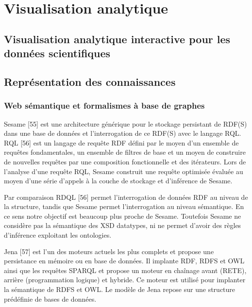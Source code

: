 \section{Visualisation analytique}

\subsection{Visualisation analytique interactive pour les données scientifiques}

\subsection{Représentation des connaissances}

\subsubsection{Web sémantique et formalismes à base de graphes}

Sesame [55] est une architecture générique pour le stockage persistant de RDF(S) dans une base de données et l'interrogation de ce RDF(S) avec le langage RQL. RQL [56] est un langage de requête RDF défini par le moyen d'un ensemble de requêtes fondamentales, un ensemble de filtres de base et un moyen de construire de nouvelles requêtes par une composition fonctionnelle et des itérateurs. Lors de l'analyse d’une requête RQL, Sesame construit une requête optimisée évaluée au moyen d'une série d'appels à la couche de stockage et d’inférence de Sesame.

Par comparaison RDQL [56] permet l'interrogation de données RDF au niveau de la structure, tandis que Sesame permet l’interrogation au niveau sémantique. En ce sens notre objectif est beaucoup plus proche de Sesame. Toutefois Sesame ne considère pas la sémantique des XSD datatypes, ni ne permet d’avoir des règles d'inférence exploitant les ontologies.

Jena [57] est l’un des moteurs actuels les plus complets et propose une persistance en mémoire ou en base de données. Il implante RDF, RDFS et OWL ainsi que les requêtes SPARQL et propose un moteur en chaînage avant (RETE), arrière (programmation logique) et hybride. Ce moteur est utilisé pour implanter la sémantique de RDFS et OWL. Le modèle de Jena repose sur une structure prédéfinie de bases de données.


